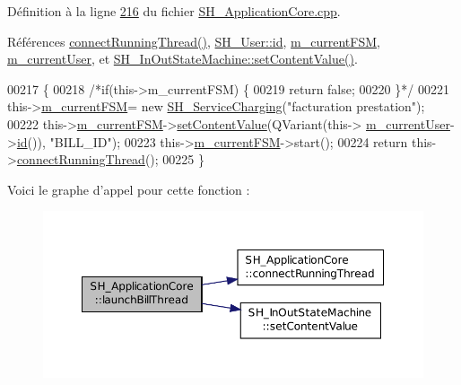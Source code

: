Définition à la ligne \hyperlink{SH__ApplicationCore_8cpp_source_l00216}{216} du fichier \hyperlink{SH__ApplicationCore_8cpp_source}{S\-H\-\_\-\-Application\-Core.\-cpp}.



Références \hyperlink{classSH__ApplicationCore_a3a10c2d662707140340d7a827d119c8d}{connect\-Running\-Thread()}, \hyperlink{classSH__User_ad6fb57220df359c4cd28fbd8fcc71b12}{S\-H\-\_\-\-User\-::id}, \hyperlink{classSH__ApplicationCore_a1088f3ba13abb8b3989cc0c325524232}{m\-\_\-current\-F\-S\-M}, \hyperlink{classSH__ApplicationCore_aa61720acee7e06e9828c570e8190304a}{m\-\_\-current\-User}, et \hyperlink{classSH__InOutStateMachine_aa2766b7a7ba39c35a10df7fc0c151b4f}{S\-H\-\_\-\-In\-Out\-State\-Machine\-::set\-Content\-Value()}.


\begin{DoxyCode}
00217 \{
00218     \textcolor{comment}{/*if(this->m\_currentFSM) \{}
00219 \textcolor{comment}{        return false;}
00220 \textcolor{comment}{    \}*/}
00221     this->\hyperlink{classSH__ApplicationCore_a1088f3ba13abb8b3989cc0c325524232}{m\_currentFSM}= \textcolor{keyword}{new} \hyperlink{classSH__ServiceCharging}{SH\_ServiceCharging}(\textcolor{stringliteral}{"facturation prestation"});
00222     this->\hyperlink{classSH__ApplicationCore_a1088f3ba13abb8b3989cc0c325524232}{m\_currentFSM}->\hyperlink{classSH__InOutStateMachine_aa2766b7a7ba39c35a10df7fc0c151b4f}{setContentValue}(QVariant(this->
      \hyperlink{classSH__ApplicationCore_aa61720acee7e06e9828c570e8190304a}{m\_currentUser}->\hyperlink{classSH__User_ad6fb57220df359c4cd28fbd8fcc71b12}{id}()), \textcolor{stringliteral}{"BILL\_ID"});
00223     this->\hyperlink{classSH__ApplicationCore_a1088f3ba13abb8b3989cc0c325524232}{m\_currentFSM}->start();
00224     \textcolor{keywordflow}{return} this->\hyperlink{classSH__ApplicationCore_a3a10c2d662707140340d7a827d119c8d}{connectRunningThread}();
00225 \}
\end{DoxyCode}


Voici le graphe d'appel pour cette fonction \-:
\nopagebreak
\begin{figure}[H]
\begin{center}
\leavevmode
\includegraphics[width=350pt]{classSH__ApplicationCore_a17a048025bc51a96663029e58c722741_cgraph}
\end{center}
\end{figure}


